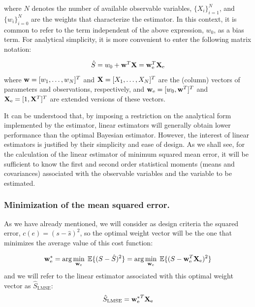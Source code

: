 where $N$ denotes the number of available observable variables, $\{X_i\}_{i=1}^N$, and $\{w_i\}_{i=0}^{N}$ are the weights that characterize the estimator. In this context, it is common to refer to the term independent of the above expression, $w_0$, as a bias term. For analytical simplicity, it is more convenient to enter the following matrix notation:

\begin{equation}
\hat S = w_0 + {\bf w}^T {\bf X} = {\bf w}_{\text{e}}^T {\bf X}_{\text{e}}
\label{Est:Sestlineal}
\end{equation}
where ${\bf w} = [w_1,\dots,w_N]^T$ and ${\bf X} = [X_1,\dots,X_N]^T$ are the (column) vectors  of parameters and observations, respectively, and ${\bf w}_{\text{e}} = [w_0, {\bf w}^T]^T$ and ${\bf X}_{\text{e}} = [1, {\bf X}^T]^T$ are extended versions of these vectors.

It can be understood that, by imposing a restriction on the analytical form implemented by the estimator, linear estimators will generally obtain lower performance than the optimal Bayesian estimator. However, the interest of linear estimators is justified by their simplicity and ease of design. As we shall see, for the calculation of the linear estimator of minimum squared mean error, it will be sufficient to know the first and second order statistical moments (means and covariances) associated with the observable variables and the variable to be estimated.



\subsubsection{Minimization of the {mean squared error}.}%

As we have already mentioned, we will consider as design criteria the squared error, $c(e) = (s-\hat s)^2$, so the optimal weight vector will be the one that minimizes the average value of this cost function:

\begin{equation}
{\bf w}_\text{e}^* = \arg\min_{{\bf w}_\text{e}} \; \mathbb{E}\{(S - \hat S)^2\} =  \arg\min_{{\bf w}_\text{e}}\;  \mathbb{E}\{(S - {\bf w}_{\text{e}}^T {\bf X}_{\text{e}})^2\}
\end{equation}
and we will refer to the linear estimator associated with this optimal weight vector as $\hat S_\text{LMSE}$: 
$$\hat S_\text{LMSE} = {{\bf w}_{\text{e}}^*}^T {\bf X}_{\text{e}}$$

